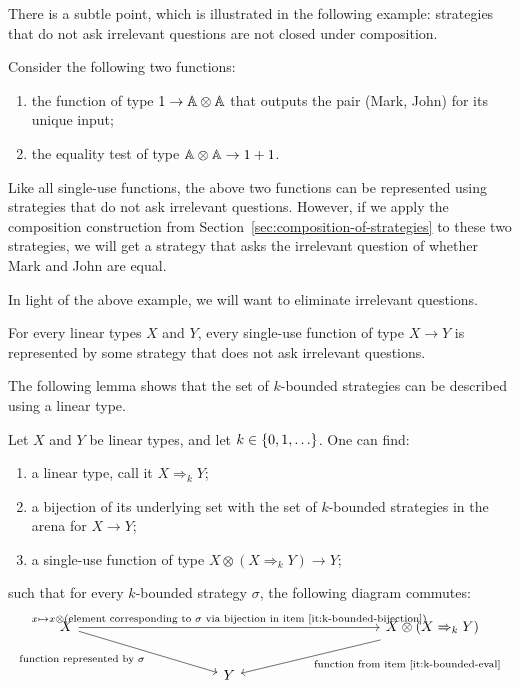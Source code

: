 There is a subtle point, which is illustrated in the following example:  strategies that do not ask irrelevant questions are not closed under composition. 

\begin{example}
    Consider the  following two functions: 
    \begin{enumerate}
        \item the function of type  $1 \to \mathbb A \otimes \mathbb A$ that outputs the pair (Mark, John) for its unique input;
        \item the equality test of type $\mathbb A \otimes \mathbb A \to 1 + 1$.
    \end{enumerate}
    Like all single-use functions, the above two functions can be represented using strategies that do not ask irrelevant questions. However, if we apply the composition construction from Section~\ref{sec:composition-of-strategies} to these two strategies, we will get a strategy that asks the irrelevant question of whether Mark and John are equal. \exampleend
\end{example}

In light of the above example, we will want to eliminate irrelevant questions. 

\begin{lemma}\label{lem:eliminate-irrelevant-questions}
    For every linear types $X$ and $Y$, every single-use function of type  $X \to Y$ is represented by  some strategy that does not ask irrelevant questions.
\end{lemma}


The following lemma shows that the set of $k$-bounded strategies can be described using a linear type.

\begin{lemma}\label{lem:linear-type-of-k-bounded-strategies}
    Let $X$ and $Y$ be linear types, and let $k \in \{0,1,\ldots\}$. One can find: 
    \begin{enumerate}
        \item \label{it:k-bounded-type} a linear type, call it $X \Rightarrow_k Y$;
        \item \label{it:k-bounded-bijection} a bijection of its underlying set with the set of $k$-bounded strategies in the arena for $X \to Y$;
        \item \label{it:k-bounded-eval} a single-use function of type $X \otimes (X \Rightarrow_k Y) \to Y$;\end{enumerate}
    such that for every $k$-bounded strategy $\sigma$, the following diagram commutes:
    \[
    \begin{tikzcd}[column sep=3.5cm]
    X  
    \ar[rr,"{x \mapsto x \otimes \text{(element corresponding to $\sigma$ via bijection in item~\ref{it:k-bounded-bijection}})}"]
    \ar[dr,"{\text{function represented by $\sigma$}}"']
    & & 
    X \otimes (X \Rightarrow_k Y)
    \ar[dl,"\text{function from item~\ref{it:k-bounded-eval}}"]
    \\
    & Y
    \end{tikzcd}
    \]    
\end{lemma}




